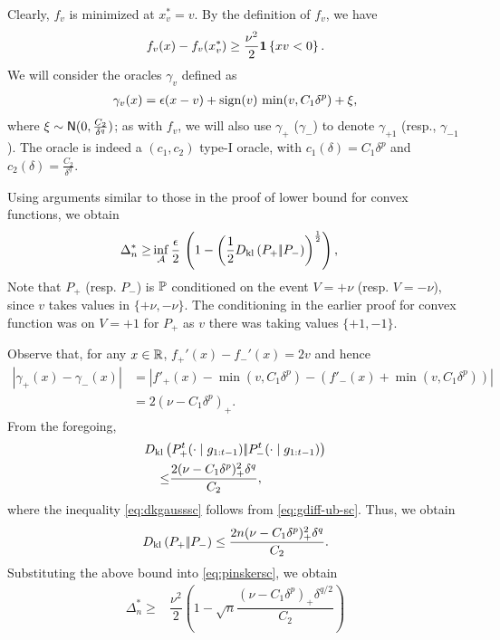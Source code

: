 Clearly, $f_v$ is minimized at $x^*_v = v$.
By the definition of $f_v$, we have
\begin{align}
  f_v(x) - f_v(x^*_v)
\ge  \dfrac{\nu^2}{2}  \indic{x v  < 0}. \label{eq:fv-lb-sc}
\end{align}
We will consider the oracles $\gamma_v$ defined as 
\begin{align}
 \gamma_v(x) = \epsilon(x-v) + \sign(v)\, \min(v,C_1 \delta^p) + \xi, \label{eq:oracle-1d}
\end{align}
where $\xi \sim \normal(0,\frac{C_2}{\delta^q})$; as with $f_v$, we will also use $\gamma_{+}$ ($\gamma_-$) 
to denote $\gamma_{+1}$ (resp., $\gamma_{-1}$).
The oracle is indeed a $(c_1,c_2)$ type-I oracle, with $c_1(\delta)=C_1\delta^p$ and $c_2(\delta)=\frac{C_2}{\delta^q}$.

Using arguments similar to those in the proof of lower bound for convex functions, we obtain
\begin{align}
\Delta_n^{*} %
  \ge  &\inf_{\A} \dfrac{\epsilon }{2}  \,\left( 1 - \left(\frac12\dkl{P_{+}}{P_{-}}\right)^{\frac{1}{2}}\right), \label{eq:pinskersc}
\end{align}
Note that $P_+$ (resp. $P_-$) is $\P$ conditioned on the event $V=+\nu$ (resp. $V=-\nu$), since $v$ takes values in $\{+\nu,-\nu\}$. The conditioning in the earlier proof for convex function was on $V=+1$ for $P_+$ as $v$ there was taking values $\{+1,-1\}$.

Observe that, for any $x\in \R$, $f_+'(x) - f_-'(x) = 2v$ and hence
\begin{align}
 |\gamma_+(x) - \gamma_-(x)| 
& = | f'_+(x) - \min(v,C_1 \delta^p) - (f'_-(x)+\min(v,C_1 \delta^p)) | \nonumber \\
& = 2 (\nu - C_1 \delta^p)_+.
 \label{eq:gdiff-ub-sc}
\end{align}
From the foregoing, 
\begin{align}
 \MoveEqLeft \dkl{P_{+}^t(\cdot\mid g_{1:t-1})}{P_{-}^t(\cdot\mid g_{1:t-1})}\nonumber\\
 \le & \dfrac{2(\nu-C_1\delta^p)_+^2\delta^q}{C_2},\label{eq:dkgausssc}
\end{align}
where the inequality \eqref{eq:dkgausssc} follows from \eqref{eq:gdiff-ub-sc}.
Thus, we obtain
\begin{align}
\dkl{P_{+}}{P_{-}} \le \dfrac{2n(\nu-C_1\delta^p)_+^2 \delta^q}{C_2}.
\end{align}
Substituting the above bound into \eqref{eq:pinskersc}, we obtain 
\begin{align}
 \Delta_n^{*}
  \ge & \dfrac{\nu^2}{2} \left(1 - \sqrt{
    n}  \dfrac{(\nu-C_1\delta^p)_+\delta^{q/2}}{C_2}
  \right)\label{eq:final-lower-bd-sc}
\end{align}


